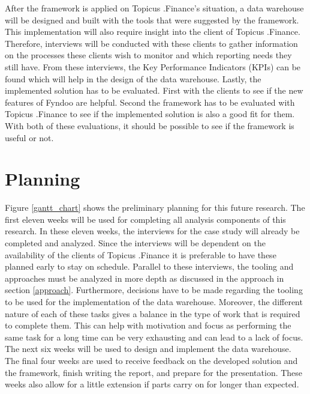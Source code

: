 \documentclass[11pt]{article}
\begin{document}
After the framework is applied on Topicus .Finance's situation, a data warehouse will be designed and built with the tools that were suggested by the framework. This implementation will also require insight into the client of Topicus .Finance. Therefore, interviews will be conducted with these clients to gather information on the processes these clients wish to monitor and which reporting needs they still have. From these interviews, the Key Performance Indicators (KPIs) can be found which will help in the design of the data warehouse. Lastly, the implemented solution has to be evaluated. First with the clients to see if the new features of Fyndoo are helpful. Second the framework has to be evaluated with Topicus .Finance to see if the implemented solution is also a good fit for them. With both of these evaluations, it should be possible to see if the framework is useful or not.

\section{Planning}
\label{planning}
Figure \ref{gantt_chart} shows the preliminary planning for this future research. The first eleven weeks will be used for completing all analysis components of this research. In these eleven weeks, the interviews for the case study will already be completed and analyzed. Since the interviews will be dependent on the availability of the clients of Topicus .Finance it is preferable to have these planned early to stay on schedule. Parallel to these interviews, the tooling and approaches must be analyzed in more depth as discussed in the approach in section \ref{approach}. Furthermore, decisions have to be made regarding the tooling to be used for the implementation of the data warehouse. Moreover, the different nature of each of these tasks gives a balance in the type of work that is required to complete them. This can help with motivation and focus as performing the same task for a long time can be very exhausting and can lead to a lack of focus. The next six weeks will be used to design and implement the data warehouse. The final four weeks are used to receive feedback on the developed solution and the framework, finish writing the report, and prepare for the presentation. These weeks also allow for a little extension if parts carry on for longer than expected.
\end{document}
